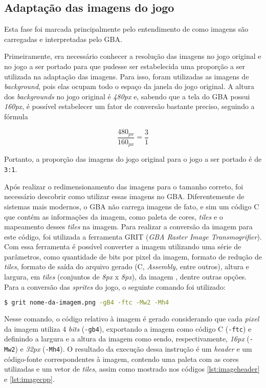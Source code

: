 \subsection{Adaptação das imagens do jogo}

Esta fase foi marcada principalmente pelo entendimento de como imagens são carregadas e interpretadas pelo GBA.

Primeiramente, era necessário conhecer a resolução das imagens no jogo original e no jogo a ser portado para que pudesse ser estabelecida uma proporção a ser utilizada na adaptação das imagens. Para isso, foram utilizadas as imagens de \textit{background}, pois elas ocupam todo o espaço da janela do jogo original. A altura dos \textit{backgrounds} no jogo original é \textit{480px} e, sabendo que a tela do GBA possui \textit{160px}, é possível estabelecer um fator de conversão bastante preciso, seguindo a fórmula

\begin{equation}
\label{Cálculo da proporção das imagens do jogo}
\frac{480_{px}}{160_{px}} = \frac{3}{1}
\end{equation}

Portanto, a proporção das imagens do jogo original para o jogo a ser portado é de \texttt{3:1}.

Após realizar o redimensionamento das imagens para o tamanho correto, foi necessário descobrir como utilizar essas imagens no GBA. Diferentemente de sistemas mais modernos, o GBA não carrega imagens de fato, e sim um código C que contém as informações da imagem, como paleta de cores, \textit{tiles} e o mapeamento desses \textit{tiles} na imagem. Para realizar a conversão da imagem para este código, foi utilizada a ferramenta GRIT (\textit{GBA Raster Image Transmogrifier}). Com essa ferramenta é possível converter a imagem utilizando uma série de parâmetros, como quantidade de bits por pixel da imagem, formato de redução de \textit{tiles}, formato de saída do arquivo gerado (C, \textit{Assembly}, entre outros), altura e largura, em \textit{tiles} (conjuntos de \textit{8px} x \textit{8px}), da imagem , dentre outras opções. Para a conversão das \textit{sprites} do jogo, o seguinte comando foi utilizado:

\begin{lstlisting}[language=bash,caption={Comando para conversão das imagens em código}]
$ grit nome-da-imagem.png -gB4 -ftc -Mw2 -Mh4
\end{lstlisting}

Nesse comando, o código relativo à imagem é gerado considerando que cada \textit{pixel} da imagem utiliza 4 \textit{bits} (\texttt{-gb4}), exportando a imagem como código C (\texttt{-ftc}) e definindo a largura e a altura da imagem como sendo, respectivamente, \textit{16px} (\texttt{-Mw2}) e \textit{32px} (\texttt{-Mh4}). O resultado da execução dessa instrução é um \textit{header} e um código-fonte correspondentes à imagem, contendo uma paleta com as cores utilizadas e um vetor de \textit{tiles}, assim como mostrado nos códigos \ref{lst:imageheader} e \ref{lst:imagecpp}.


